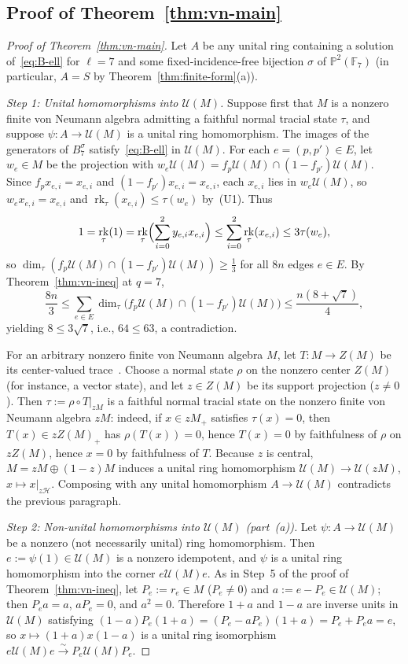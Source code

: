 \documentclass[11pt]{article}
\theoremstyle{definition}
\theoremstyle{remark}
\numberwithin{equation}{section}
\DeclareMathOperator{\rk}{rk}
\newcommand{\F}{\mathbb{F}}
\newcommand{\U}{\mathcal{U}}
\newcommand{\HH}{\mathcal{H}}
\newcommand{\1}{\mathbf{1}}
\begin{document}
\subsection{Proof of Theorem~\ref{thm:vn-main}}

\begin{proof}[Proof of Theorem~\ref{thm:vn-main}]
Let $A$ be any unital ring containing a solution of~\eqref{eq:B-ell} for $\ell = 7$ and some fixed-incidence-free bijection $\sigma$ of $\mathbb{P}^2(\F_7)$ (in particular, $A = S$ by Theorem~\ref{thm:finite-form}(a)).

\emph{Step 1: Unital homomorphisms into $\U(M)$.}
Suppose first that $M$ is a nonzero finite von Neumann algebra admitting a faithful normal tracial state $\tau$, and suppose $\psi\colon A \to \U(M)$ is a unital ring homomorphism. The images of the generators of $B_7^\sigma$ satisfy~\eqref{eq:B-ell} in $\U(M)$. For each $e = (p, p') \in E$, let $w_e \in M$ be the projection with $w_e\U(M) = f_p\U(M) \cap (1 - f_{p'})\U(M)$. Since $f_p x_{e,i} = x_{e,i}$ and $(1 - f_{p'}) x_{e,i} = x_{e,i}$, each $x_{e,i}$ lies in $w_e\U(M)$, so $w_e x_{e,i} = x_{e,i}$ and $\rk_\tau(x_{e,i}) \le \tau(w_e)$ by~(U1). Thus
\[
1 = \rk_\tau(1) = \rk_\tau\Bigl(\sum_{i=0}^2 y_{e,i} x_{e,i}\Bigr) \le \sum_{i=0}^2 \rk_\tau(x_{e,i}) \le 3\tau(w_e),
\]
so $\dim_\tau(f_p\U(M) \cap (1 - f_{p'})\U(M)) \ge \frac{1}{3}$ for all $8n$ edges $e \in E$. By Theorem~\ref{thm:vn-ineq} at $q = 7$,
\[
\frac{8n}{3} \le \sum_{e \in E} \dim_\tau\bigl(f_p\U(M) \cap (1 - f_{p'})\U(M)\bigr) \le \frac{n(8 + \sqrt{7})}{4},
\]
yielding $8 \le 3\sqrt{7}$, i.e., $64 \le 63$, a contradiction.

For an arbitrary nonzero finite von Neumann algebra $M$, let $T\colon M \to Z(M)$ be its center-valued trace~\cite[Theorem~8.2.8]{KR2}. Choose a normal state $\rho$ on the nonzero center $Z(M)$ (for instance, a vector state), and let $z \in Z(M)$ be its support projection ($z \neq 0$). Then $\tau := \rho \circ T|_{zM}$ is a faithful normal tracial state on the nonzero finite von Neumann algebra $zM$: indeed, if $x \in zM_+$ satisfies $\tau(x) = 0$, then $T(x) \in zZ(M)_+$ has $\rho(T(x)) = 0$, hence $T(x) = 0$ by faithfulness of $\rho$ on $zZ(M)$, hence $x = 0$ by faithfulness of $T$. Because $z$ is central, $M = zM \oplus (1 - z)M$ induces a unital ring homomorphism $\U(M) \to \U(zM)$, $x \mapsto x|_{z\HH}$. Composing with any unital homomorphism $A \to \U(M)$ contradicts the previous paragraph.

\emph{Step 2: Non-unital homomorphisms into $\U(M)$ (part~(a)).}
Let $\psi\colon A \to \U(M)$ be a nonzero (not necessarily unital) ring homomorphism. Then $e := \psi(1) \in \U(M)$ is a nonzero idempotent, and $\psi$ is a unital ring homomorphism into the corner $e\U(M)e$. As in Step~5 of the proof of Theorem~\ref{thm:vn-ineq}, let $P_e := r_e \in M$ ($P_e \neq 0$) and $a := e - P_e \in \U(M)$; then $P_e a = a$, $a P_e = 0$, and $a^2 = 0$. Therefore $1 + a$ and $1 - a$ are inverse units in $\U(M)$ satisfying $(1 - a) P_e (1 + a) = (P_e - a P_e)(1 + a) = P_e + P_e a = e$, so $x \mapsto (1 + a)x(1 - a)$ is a unital ring isomorphism $e\U(M)e \xrightarrow{\sim} P_e\U(M)P_e$.


\end{proof}
\end{document}
